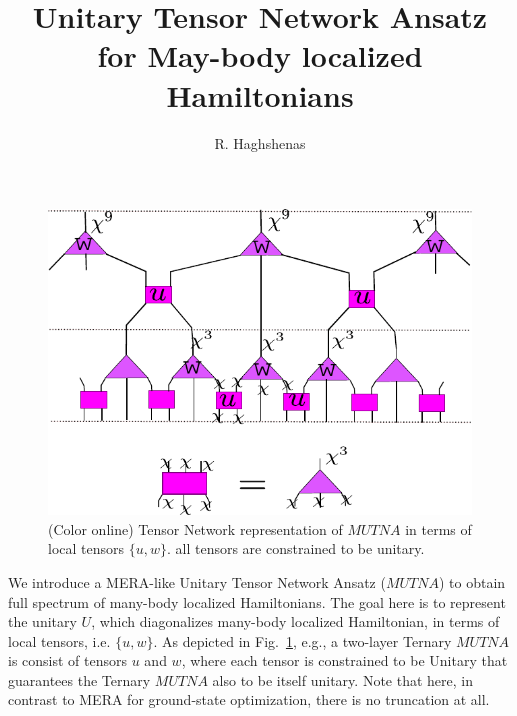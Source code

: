 \documentclass[aps,prb,twocolumn,groupedaddress,notitlepage,showpacs,floatfix,superscriptaddress]{revtex4-1}
\begin{document}
\title{Unitary Tensor Network Ansatz for May-body localized Hamiltonians}
\author{R. Haghshenas}
\maketitle

\begin{figure}
  \begin{centering}
\includegraphics[width=1.0 \linewidth]{MERA-MBL}  \end{centering}
  \caption{(Color online) Tensor Network representation of $MUTNA$ in terms of local tensors $\{u, w\}$. all tensors are constrained to be unitary.}
  \label{fig:MERA}
\end{figure}

We introduce a MERA-like Unitary Tensor Network Ansatz ($MUTNA$) to obtain full spectrum of many-body localized Hamiltonians. The goal here is to represent the unitary $U$, which diagonalizes many-body localized Hamiltonian, in terms of local tensors, i.e. $\{u, w\}$. As depicted in Fig.~\ref{fig:MERA}, e.g., a two-layer Ternary $MUTNA$ is consist of tensors $u$ and $w$, where each tensor is constrained to be Unitary that guarantees the Ternary $MUTNA$ also to be itself unitary. Note that here, in contrast to MERA for ground-state optimization, there is no truncation at all.      
\end{document}
